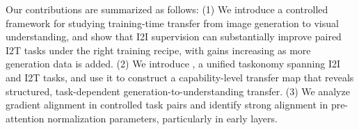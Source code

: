 Our contributions are summarized as follows:
(1) We introduce a controlled framework for studying training-time transfer from image generation to visual understanding, and show that I2I supervision can substantially improve paired I2T tasks under the right training recipe, with gains increasing as more generation data is added.
(2) We introduce \methodname, a unified taskonomy spanning I2I and I2T tasks, and use it to construct a capability-level transfer map that reveals structured, task-dependent generation-to-understanding transfer.
(3) We analyze gradient alignment in controlled task pairs and identify strong alignment in pre-attention normalization parameters, particularly in early layers.




